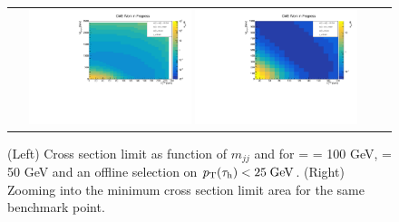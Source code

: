 \begin{figure}[tbh!]
	\centering
	\begin{tabular}{cc}
		\includegraphics[width=0.45\textwidth]{analysis/pics/JetInvMass_vs_MET_xsec_chi100_lsp050_taupt25.pdf}
		\includegraphics[width=0.45\textwidth]{analysis/pics/JetInvMass_vs_MET_xsec_chi100_lsp050_taupt25_zoom.pdf}
	\end{tabular}
	\caption{(Left) Cross section limit as function of $m_{jj}$ and \met for \charginopm = \neutralinotwo = 100 GeV, \neutralinoone = 50 GeV and an offline selection on $p_{\text{T}}(\tau_{\text{h}}) <  25\;\text{Ge}\kern-0.06667em\text{V}$. (Right) Zooming into the minimum cross section limit area for the same benchmark point.}
	\label{fig::JetInvMass_vs_MET_xsec_chi100_lsp050_taupt25}
\end{figure}

